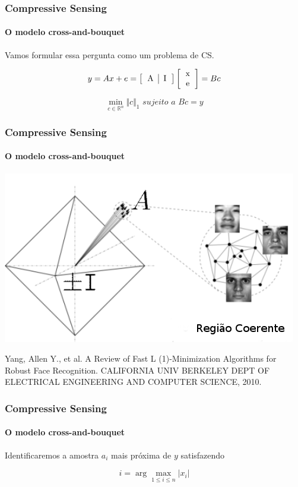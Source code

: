 \documentclass[11pt]{beamer}
\begin{document}
\begin{frame}
\frametitle{Compressive Sensing}
\framesubtitle{O modelo cross-and-bouquet}

Vamos formular essa pergunta como um problema de CS.

$$y = Ax + e = \left[ \begin{tabular}{c | c} A & I \end{tabular} \right] \left[ \begin{tabular}{c} x \\ e \end{tabular}\right] = Bc$$

$$\min_{c \in \mathbb{R}^n} \Vert c \Vert_1 \textit{ sujeito a } Bc = y$$
\end{frame}

\begin{frame}
\frametitle{Compressive Sensing}
\framesubtitle{O modelo cross-and-bouquet}
\centering
\includegraphics[scale=.4]{imagens/cross-and-bouquet.png}

\tiny{Yang, Allen Y., et al. A Review of Fast L (1)-Minimization Algorithms for Robust Face Recognition. CALIFORNIA UNIV BERKELEY DEPT OF ELECTRICAL ENGINEERING AND COMPUTER SCIENCE, 2010.}
\end{frame}

\begin{frame}
\frametitle{Compressive Sensing}
\framesubtitle{O modelo cross-and-bouquet}
\centering
Identificaremos a amostra $a_i$ mais próxima de $y$ satisfazendo

$$i = \arg \max_{1 \leq i \leq n} \vert x_i \vert$$
\end{frame}
\end{document}
